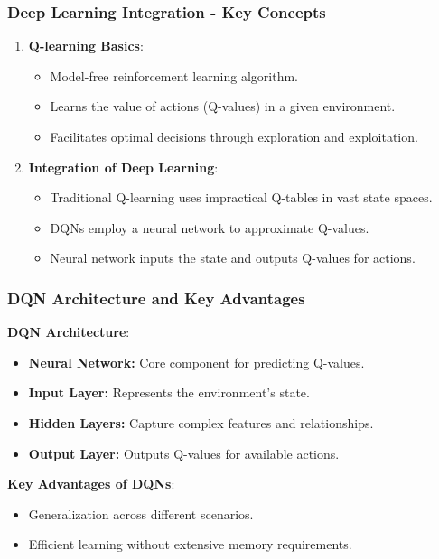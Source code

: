 \documentclass{beamer}
\begin{document}
\begin{frame}[fragile]
    \frametitle{Deep Learning Integration - Key Concepts}
    \begin{enumerate}
        \item \textbf{Q-learning Basics}:
            \begin{itemize}
                \item Model-free reinforcement learning algorithm.
                \item Learns the value of actions (Q-values) in a given environment.
                \item Facilitates optimal decisions through exploration and exploitation.
            \end{itemize}
        
        \item \textbf{Integration of Deep Learning}:
            \begin{itemize}
                \item Traditional Q-learning uses impractical Q-tables in vast state spaces.
                \item DQNs employ a neural network to approximate Q-values.
                \item Neural network inputs the state and outputs Q-values for actions.
            \end{itemize}
    \end{enumerate}
\end{frame}

\begin{frame}[fragile]
    \frametitle{DQN Architecture and Key Advantages}
    \textbf{DQN Architecture}:
    \begin{itemize}
        \item \textbf{Neural Network:} Core component for predicting Q-values.
        \item \textbf{Input Layer:} Represents the environment's state.
        \item \textbf{Hidden Layers:} Capture complex features and relationships.
        \item \textbf{Output Layer:} Outputs Q-values for available actions.
    \end{itemize}

    \textbf{Key Advantages of DQNs}:
    \begin{itemize}
        \item Generalization across different scenarios.
        \item Efficient learning without extensive memory requirements.
    \end{itemize}
\end{frame}
\end{document}
